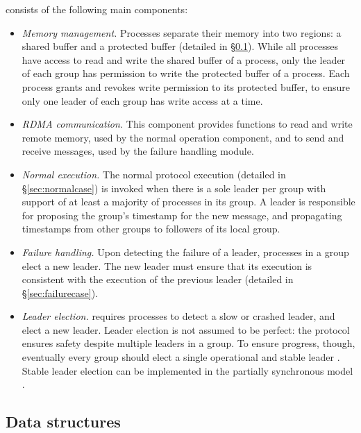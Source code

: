 \libname consists of the following main components:
\begin{itemize}
  \item \emph{Memory management.} Processes separate their memory into two regions: a shared buffer and a protected buffer (detailed in \S\ref{sec:ds-structs}). While all processes have access to read and write the shared buffer of a process, only the leader of each group has permission to write the protected buffer of a process. Each process grants and revokes write permission to its protected buffer, to ensure only one leader of each group has write access at a time.
  \item \emph{RDMA communication.} This component provides functions to read and write remote memory, used by the normal operation component, and to send and receive messages, used by the failure handling module.
  \item \emph{Normal execution.} The normal protocol execution (detailed in \S\ref{sec:normalcase}) is invoked when there is a sole leader per group with support of at least a majority of processes in its group. A leader is responsible for proposing the group's timestamp for the new message, and propagating timestamps from other groups to followers of its local group.
  \item \emph{Failure handling.} Upon detecting the failure of a leader, processes in a group elect a new leader. The new leader must ensure that its execution is consistent with the execution of the previous leader (detailed in \S\ref{sec:failurecase}).
  \item \emph{Leader election.} \libname requires processes to detect a slow or crashed leader, and elect a new leader. Leader election is not assumed to be perfect: the protocol ensures safety despite multiple leaders in a group. To ensure progress, though, eventually every group should elect a single operational and stable leader \cite{Aguilera2019,L98}.
Stable leader election can be implemented in the partially synchronous model \cite{Aguilera2001}.
\end{itemize}

\subsection{Data structures}
\label{sec:ds-structs}

